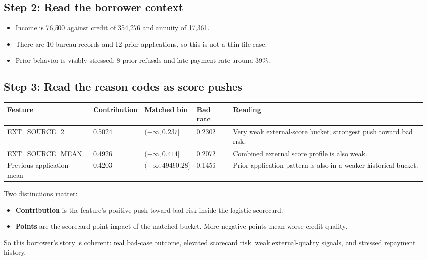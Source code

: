 \documentclass[11pt]{article}
\begin{document}
\subsection{Step 2: Read the borrower context}

\begin{itemize}
  \item Income is 76{,}500 against credit of 354{,}276 and annuity of 17{,}361.
  \item There are 10 bureau records and 12 prior applications, so this is not a thin-file case.
  \item Prior behavior is visibly stressed: 8 prior refusals and late-payment rate around 39\%.
\end{itemize}

\subsection{Step 3: Read the reason codes as score pushes}

{\small
\begin{tabularx}{\textwidth}{@{}P{0.26\textwidth}P{0.12\textwidth}P{0.18\textwidth}P{0.10\textwidth}Y@{}}
\toprule
Feature & Contribution & Matched bin & Bad rate & Reading \\
\midrule
EXT\_SOURCE\_2 & 0.5024 & $(-\infty, 0.237]$ & 0.2302 & Very weak external-score bucket; strongest push toward bad risk. \\
EXT\_SOURCE\_MEAN & 0.4926 & $(-\infty, 0.414]$ & 0.2072 & Combined external score profile is also weak. \\
Previous application mean & 0.4203 & $(-\infty, 49490.28]$ & 0.1456 & Prior-application pattern is also in a weaker historical bucket. \\
\bottomrule
\end{tabularx}
}

Two distinctions matter:

\begin{itemize}
  \item \textbf{Contribution} is the feature's positive push toward bad risk inside the logistic scorecard.
  \item \textbf{Points} are the scorecard-point impact of the matched bucket. More negative points mean worse credit quality.
\end{itemize}

So this borrower's story is coherent: real bad-case outcome, elevated scorecard risk, weak external-quality signals, and stressed repayment history.
\end{document}
